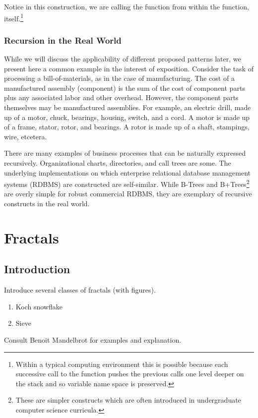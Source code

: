 \documentclass[jou,apacite]{apa6}
\begin{document}
Notice in this construction, we are calling the function from within the function, itself.\footnote{Within a typical computing environment this is possible because each successive call to the function pushes the previous calls one level deeper on the stack and so variable name space is preserved.}

\subsubsection{Recursion in the Real World}  %
While we will discuss the applicability of different proposed patterns later, we present here a common example in the interest of exposition.  Consider the task of processing a bill-of-materials, as in the case of manufacturing. The cost of a manufactured assembly (component) is the sum of the cost of component parts plus any associated labor and other overhead. However, the component parts themselves may be manufactured assemblies.  For example, an electric drill, made up
of a motor, chuck, bearings, housing, switch, and a cord. A motor is made up of a frame, stator, rotor, and bearings.  A rotor is made up of a shaft, stampings, wire, etcetera.

There are many examples of business processes that can be naturally expressed recursively.  Organizational charts, directories, and call trees are some.  The underlying implementations on which enterprise relational database management systems (RDBMS) are constructed are self-similar.  While B-Trees and B+Trees\footnote{These are simpler constructs which are often introduced in undergraduate computer science curricula.} are overly simple for robust commercial RDBMS, they are
exemplary of recursive constructs in the real world.

\section{Fractals}  %
\subsection{Introduction}
Introduce several classes of fractals (with figures).
\begin{enumerate}
  \item Koch snowflake
  \item Sieve 
\end{enumerate}
Consult Benoit Mandelbrot for examples and explanation.
\end{document}

